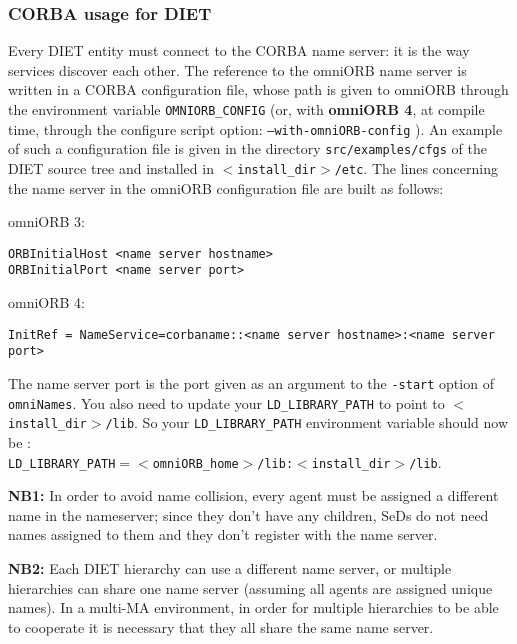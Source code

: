 \subsubsection{CORBA usage for DIET}

Every DIET entity must connect to the CORBA name server:
it is the way services discover each other. The reference to the
omniORB name server is written in a CORBA configuration file, whose path
is given to omniORB through the environment variable
\texttt{OMNIORB\_CONFIG} (or, with \textbf{omniORB 4}, at compile
time, through the configure script option:
\texttt{--with-omniORB-config} ). An example of such a
configuration file is given in the directory
\texttt{src/examples/cfgs} of the DIET source tree and installed in
\texttt{$<$install\_dir$>$/etc}. The lines concerning the name server
in the omniORB configuration file are built as follows:
\begin{description}
 \item{omniORB 3:}
{\footnotesize
\begin{verbatim}
ORBInitialHost <name server hostname>
ORBInitialPort <name server port>
\end{verbatim}
}
 \item{omniORB 4:}
{\footnotesize
\begin{verbatim}
InitRef = NameService=corbaname::<name server hostname>:<name server
port>
\end{verbatim}
} 
\end{description}
The name server port is the port given as an argument to the
\texttt{-start} option of \texttt{omniNames}.  You also need to update
your \texttt{LD\_LIBRARY\_PATH} to point to
\texttt{$<$install\_dir$>$/lib}.  So your \texttt{LD\_LIBRARY\_PATH}
environment variable should now be :\\ \texttt{LD\_LIBRARY\_PATH$=
<$omniORB\_home$>$/lib:$<$install\_dir$>$/lib}.

\textbf{NB1:} In order to avoid name collision, every agent must be 
assigned a different name in the nameserver; since they don't have any 
children, SeDs do not need names assigned to them and they don't register with
the name server.

\textbf{NB2:} Each DIET hierarchy can use a different name server, or multiple 
hierarchies can share one name server (assuming all agents are assigned 
unique names).  In a multi-MA environment, in order for multiple hierarchies
to be able to cooperate it is necessary that they all share the same
name server.

